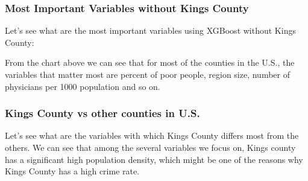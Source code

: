 \documentclass{beamer}
\begin{document}
\begin{frame}[fragile]
\frametitle{Most Important Variables without Kings County}
Let's see what are the most important variables using XGBoost without Kings County:
\begin{center}
\end{center}
 From the chart above we can see that for most of the counties in the U.S., the variables that matter most are percent of poor people, region size, number of physicians per 1000 population and so on.
\end{frame}




\begin{frame}[fragile]
\frametitle{Kings County vs other counties in U.S.}
Let's see what are the variables with which Kings County differs most from the others. We can see that among the several variables we focus on, Kings county has a significant high population density, which might be one of the reasons why Kings County has a high crime rate.
\begin{center}
\end{center}
\end{frame}
\end{document}
